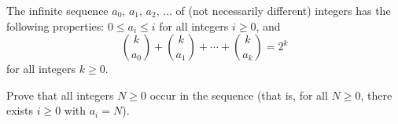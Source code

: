 The infinite sequence $a_0,\, a_1,\, a_2,\, \ldots$ of (not necessarily different) integers has the following properties: $0 \leq a_i \leq i$ for all integers $i \geq 0$, and
\[
\binom{k}{a_0} + \binom{k}{a_1} + \cdots + \binom{k}{a_k} = 2^k
\]
for all integers $k \geq 0$.

Prove that all integers $N \geq 0$ occur in the sequence (that is, for all $N \geq 0$, there exists $i \geq 0$ with $a_i = N$).
